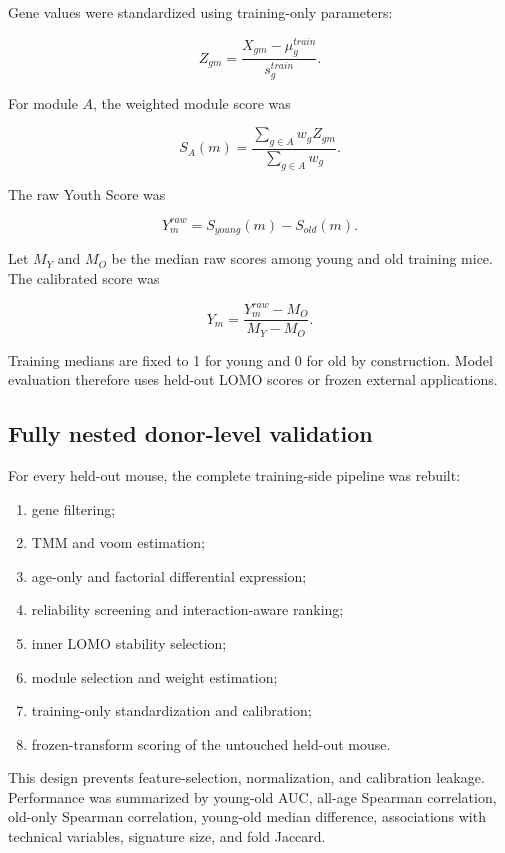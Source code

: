 \documentclass[10pt,twocolumn]{article}
\providecommand{\tightlist}{\setlength{\itemsep}{0pt}\setlength{\parskip}{0pt}}
\begin{document}
Gene values were standardized using training-only parameters:

\[
Z_{gm}=\frac{X_{gm}-\mu_g^{train}}{s_g^{train}}.
\]

For module \(A\), the weighted module score was

\[
S_A(m)=
\frac{\sum_{g\in A}w_gZ_{gm}}
{\sum_{g\in A}w_g}.
\]

The raw Youth Score was

\[
Y_m^{raw}=S_{young}(m)-S_{old}(m).
\]

Let \(M_Y\) and \(M_O\) be the median raw scores among young and old training mice. The calibrated score was

\[
Y_m=
\frac{Y_m^{raw}-M_O}{M_Y-M_O}.
\]

Training medians are fixed to 1 for young and 0 for old by construction. Model evaluation therefore uses held-out LOMO scores or frozen external applications.

\subsection{Fully nested donor-level validation}\label{fully-nested-donor-level-validation}

For every held-out mouse, the complete training-side pipeline was rebuilt:

\begin{enumerate}
\def\labelenumi{\arabic{enumi}.}
\tightlist
\item
  gene filtering;
\item
  TMM and voom estimation;
\item
  age-only and factorial differential expression;
\item
  reliability screening and interaction-aware ranking;
\item
  inner LOMO stability selection;
\item
  module selection and weight estimation;
\item
  training-only standardization and calibration;
\item
  frozen-transform scoring of the untouched held-out mouse.
\end{enumerate}

This design prevents feature-selection, normalization, and calibration leakage. Performance was summarized by young-old AUC, all-age Spearman correlation, old-only Spearman correlation, young-old median difference, associations with technical variables, signature size, and fold Jaccard.
\end{document}
